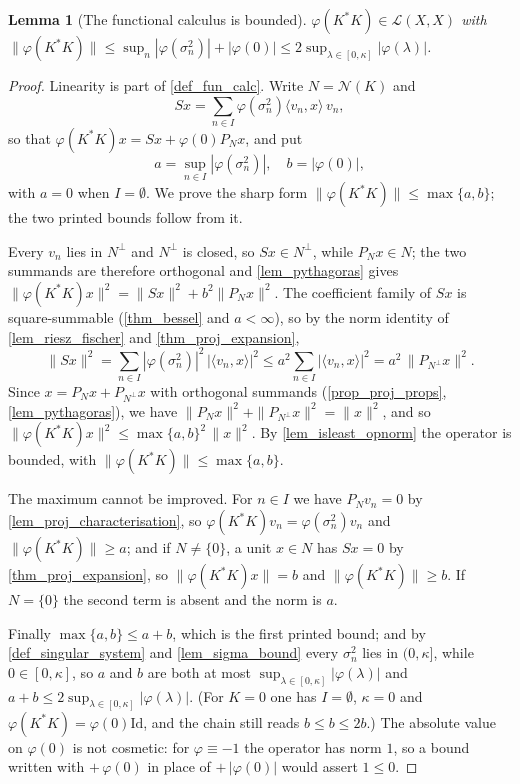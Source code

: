 \documentclass[a4paper]{report}
\theoremstyle{plain}
\newtheorem{lemma}[theorem]{Lemma}
\theoremstyle{definition}
\theoremstyle{remark}
\begin{document}
\begin{lemma}[The functional calculus is bounded]
  \label{lem_fun_calc_bounded}
  $\varphi(K^*K) \in \mathcal{L}(X,X)$ with
  $\|\varphi(K^*K)\| \le \sup_n|\varphi(\sigma_n^2)| + |\varphi(0)|
   \le 2\sup_{\lambda\in[0,\kappa]}|\varphi(\lambda)|$.
\end{lemma}
\begin{proof}
  Linearity is part of \cref{def_fun_calc}.  Write $N = \mathcal{N}(K)$ and
  \[
    Sx = \sum_{n\in I}\varphi(\sigma_n^2)\langle v_n,x\rangle\,v_n ,
  \]
  so that $\varphi(K^*K)x = Sx + \varphi(0)P_Nx$, and put
  \[
    a = \sup_{n \in I}|\varphi(\sigma_n^2)| , \quad b = |\varphi(0)| ,
  \]
  with $a = 0$ when $I = \emptyset$.  We prove the sharp form
  $\|\varphi(K^*K)\| \le \max\{a,b\}$; the two printed bounds follow from it.

  Every $v_n$ lies in $N^\perp$ and $N^\perp$ is closed, so $Sx \in N^\perp$, while
  $P_Nx \in N$; the two summands are therefore orthogonal and \cref{lem_pythagoras} gives
  $\|\varphi(K^*K)x\|^2 = \|Sx\|^2 + b^2\|P_Nx\|^2$.  The coefficient family of $Sx$ is
  square-summable (\cref{thm_bessel} and $a < \infty$), so by the norm identity of
  \cref{lem_riesz_fischer} and \cref{thm_proj_expansion},
  \[
    \|Sx\|^2 = \sum_{n \in I}|\varphi(\sigma_n^2)|^2\,|\langle v_n,x\rangle|^2
      \le a^2\sum_{n \in I}|\langle v_n,x\rangle|^2
      = a^2\,\|P_{N^\perp}x\|^2 .
  \]
  Since $x = P_Nx + P_{N^\perp}x$ with orthogonal summands (\cref{prop_proj_props},
  \cref{lem_pythagoras}), we have $\|P_Nx\|^2 + \|P_{N^\perp}x\|^2 = \|x\|^2$, and so
  $\|\varphi(K^*K)x\|^2 \le \max\{a,b\}^2\,\|x\|^2$.  By \cref{lem_isleast_opnorm} the
  operator is bounded, with $\|\varphi(K^*K)\| \le \max\{a,b\}$.

  The maximum cannot be improved.  For $n \in I$ we have $P_Nv_n = 0$ by
  \cref{lem_proj_characterisation}, so $\varphi(K^*K)v_n = \varphi(\sigma_n^2)v_n$ and
  $\|\varphi(K^*K)\| \ge a$; and if $N \ne \{0\}$, a unit $x \in N$ has $Sx = 0$ by
  \cref{thm_proj_expansion}, so $\|\varphi(K^*K)x\| = b$ and
  $\|\varphi(K^*K)\| \ge b$.  If $N = \{0\}$ the second term is absent and the norm is $a$.

  Finally $\max\{a,b\} \le a + b$, which is the first printed bound; and by
  \cref{def_singular_system} and \cref{lem_sigma_bound} every $\sigma_n^2$ lies
  in $(0,\kappa]$, while
  $0 \in [0,\kappa]$, so $a$ and $b$ are both at most
  $\sup_{\lambda\in[0,\kappa]}|\varphi(\lambda)|$ and
  $a + b \le 2\sup_{\lambda\in[0,\kappa]}|\varphi(\lambda)|$.  (For $K = 0$ one has
  $I = \emptyset$, $\kappa = 0$ and $\varphi(K^*K) = \varphi(0)\mathrm{Id}$, and the chain
  still reads $b \le b \le 2b$.)  The absolute value on $\varphi(0)$ is not cosmetic: for
  $\varphi \equiv -1$ the operator has norm $1$, so a bound written with
  $+\,\varphi(0)$ in place of $+\,|\varphi(0)|$ would assert $1 \le 0$.
\end{proof}
\end{document}
